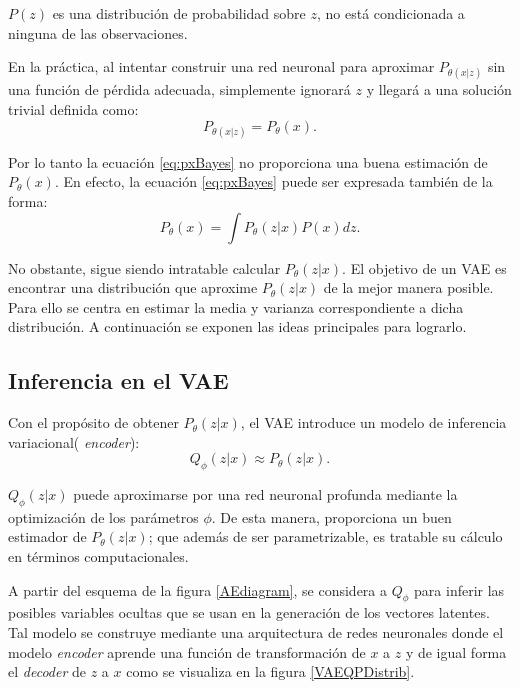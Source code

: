 $P(z)$ es una distribución de probabilidad sobre $z$, no está condicionada a ninguna de las observaciones. 

En la práctica, al intentar construir una red neuronal para aproximar $P_{\theta(x|z)}$ sin una función de pérdida adecuada, simplemente ignorará $z$ y llegará a una solución trivial \cite{Advanced} definida como:
\begin{equation*}
	P_{\theta(x|z)} = P_{\theta}(x).
\end{equation*}

Por lo tanto la ecuación \ref{eq:pxBayes} no proporciona una buena estimación de $P_{\theta}(x)$. En efecto, la ecuación \ref{eq:pxBayes} puede ser expresada también de la forma: 
\begin{equation}
	P_{\theta}(x) = \int P_{\theta}(z|x)P(x)dz .
\end{equation}

No obstante, sigue siendo intratable calcular $P_{\theta}(z|x)$. El objetivo de un VAE es encontrar una distribución que aproxime  $P_{\theta}(z|x)$ de la mejor manera posible. Para ello se centra en estimar la media y varianza correspondiente a dicha distribución. A continuación se exponen las ideas principales para lograrlo.

 
\subsection{Inferencia en el VAE}\label{3-VAEInference}
Con el propósito de obtener $P_{\theta}(z|x)$, el VAE introduce un modelo de inferencia variacional( \textit{encoder}):
\begin{equation}
	Q_{\phi}(z|x) \approx P_{\theta}(z|x).
\end{equation}

$Q_{\phi}(z|x)$ puede aproximarse por una red neuronal profunda mediante la optimización de los parámetros $\phi$. De esta manera, proporciona un buen estimador de $P_{\theta}(z|x)$; que además de ser parametrizable, es tratable su cálculo en términos computacionales. 

A partir del esquema de la figura \ref{AEdiagram}, se considera a $Q_{\phi}$ para inferir las posibles variables ocultas que se usan en la generación de los vectores latentes. Tal modelo se construye mediante una arquitectura de redes neuronales donde el modelo \textit{encoder} aprende una función de transformación  de $x$ a $z$ y de igual forma el \textit{decoder} de $z$ a $x$ como se visualiza en la figura \ref{VAEQPDistrib}.

